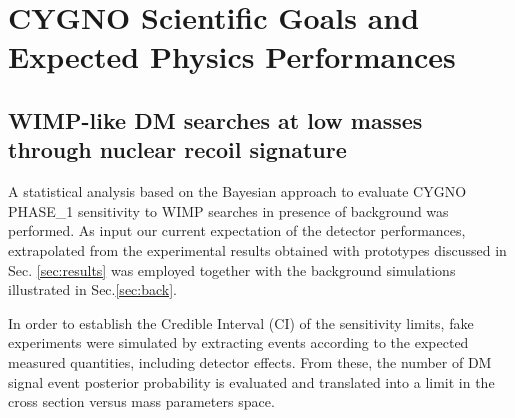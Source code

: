 \documentclass[physics,article,submit,moreauthors,pdftex]{Definitions/mdpi}
\begin{document}


\section{CYGNO Scientific Goals and Expected Physics Performances}\label{sec:physics}




\subsection{WIMP-like DM searches at low masses through nuclear recoil signature} \label{sec:wimp}

A statistical analysis based on the Bayesian approach to evaluate CYGNO PHASE\_1 sensitivity to WIMP searches in presence of background was performed. As input our current expectation of the detector performances, extrapolated from the experimental results obtained with prototypes discussed in Sec. \ref{sec:results} was employed together with the background simulations illustrated in Sec.\ref{sec:back}.  

In order to establish the Credible Interval (CI) of the sensitivity limits,  fake experiments were simulated by extracting events according to the expected measured quantities, including detector effects. From these, the number of DM signal event posterior probability is evaluated and translated into a limit in the cross section versus mass parameters space.
\end{document}
